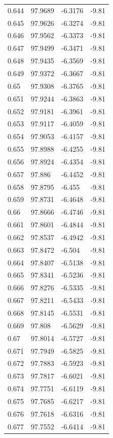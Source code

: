 \begin{tabular}{llll}
0.644 & 97.9689 & -6.3176 & -9.81 \\
0.645 & 97.9626 & -6.3274 & -9.81 \\
0.646 & 97.9562 & -6.3373 & -9.81 \\
0.647 & 97.9499 & -6.3471 & -9.81 \\
0.648 & 97.9435 & -6.3569 & -9.81 \\
0.649 & 97.9372 & -6.3667 & -9.81 \\
0.65 & 97.9308 & -6.3765 & -9.81 \\
0.651 & 97.9244 & -6.3863 & -9.81 \\
0.652 & 97.9181 & -6.3961 & -9.81 \\
0.653 & 97.9117 & -6.4059 & -9.81 \\
0.654 & 97.9053 & -6.4157 & -9.81 \\
0.655 & 97.8988 & -6.4255 & -9.81 \\
0.656 & 97.8924 & -6.4354 & -9.81 \\
0.657 & 97.886 & -6.4452 & -9.81 \\
0.658 & 97.8795 & -6.455 & -9.81 \\
0.659 & 97.8731 & -6.4648 & -9.81 \\
0.66 & 97.8666 & -6.4746 & -9.81 \\
0.661 & 97.8601 & -6.4844 & -9.81 \\
0.662 & 97.8537 & -6.4942 & -9.81 \\
0.663 & 97.8472 & -6.504 & -9.81 \\
0.664 & 97.8407 & -6.5138 & -9.81 \\
0.665 & 97.8341 & -6.5236 & -9.81 \\
0.666 & 97.8276 & -6.5335 & -9.81 \\
0.667 & 97.8211 & -6.5433 & -9.81 \\
0.668 & 97.8145 & -6.5531 & -9.81 \\
0.669 & 97.808 & -6.5629 & -9.81 \\
0.67 & 97.8014 & -6.5727 & -9.81 \\
0.671 & 97.7949 & -6.5825 & -9.81 \\
0.672 & 97.7883 & -6.5923 & -9.81 \\
0.673 & 97.7817 & -6.6021 & -9.81 \\
0.674 & 97.7751 & -6.6119 & -9.81 \\
0.675 & 97.7685 & -6.6217 & -9.81 \\
0.676 & 97.7618 & -6.6316 & -9.81 \\
0.677 & 97.7552 & -6.6414 & -9.81 \\

\end{tabular}
